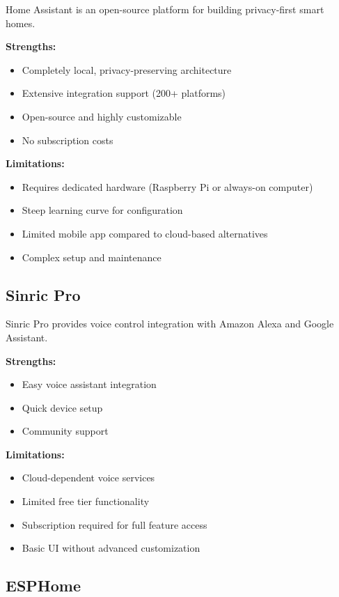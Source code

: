 Home Assistant is an open-source platform for building privacy-first smart homes.

\textbf{Strengths:}
\begin{itemize}
    \item Completely local, privacy-preserving architecture
    \item Extensive integration support (200+ platforms)
    \item Open-source and highly customizable
    \item No subscription costs
\end{itemize}

\textbf{Limitations:}
\begin{itemize}
    \item Requires dedicated hardware (Raspberry Pi or always-on computer)
    \item Steep learning curve for configuration
    \item Limited mobile app compared to cloud-based alternatives
    \item Complex setup and maintenance
\end{itemize}

\subsection{Sinric Pro}

Sinric Pro provides voice control integration with Amazon Alexa and Google Assistant.

\textbf{Strengths:}
\begin{itemize}
    \item Easy voice assistant integration
    \item Quick device setup
    \item Community support
\end{itemize}

\textbf{Limitations:}
\begin{itemize}
    \item Cloud-dependent voice services
    \item Limited free tier functionality
    \item Subscription required for full feature access
    \item Basic UI without advanced customization
\end{itemize}

\subsection{ESPHome}

